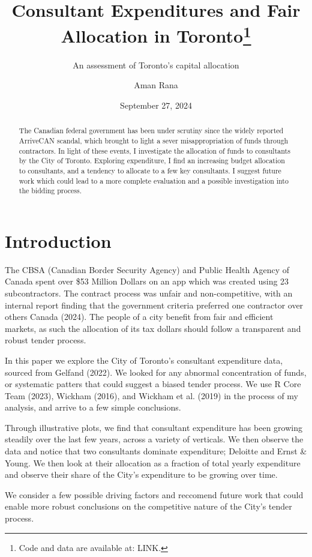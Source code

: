 \documentclass[
  letterpaper,
  DIV=11,
  numbers=noendperiod]{scrartcl}
\title{Consultant Expenditures and Fair Allocation in
Toronto\thanks{Code and data are available at: LINK.}}
\subtitle{An assessment of Toronto's capital allocation}
\author{Aman Rana}
\date{September 27, 2024}
\begin{document}
\maketitle
\begin{abstract}
The Canadian federal government has been under scrutiny since the widely
reported ArriveCAN scandal, which brought to light a sever
misappropriation of funds through contractors. In light of these events,
I investigate the allocation of funds to consultants by the City of
Toronto. Exploring expenditure, I find an increasing budget allocation
to consultants, and a tendency to allocate to a few key consultants. I
suggest future work which could lead to a more complete evaluation and a
possible investigation into the bidding process.
\end{abstract}


\section{Introduction}\label{introduction}

The CBSA (Canadian Border Security Agency) and Public Health Agency of
Canada spent over \$53 Million Dollars on an app which was created using
23 subcontractors. The contract process was unfair and non-competitive,
with an internal report finding that the government criteria preferred
one contractor over others Canada (2024). The people of a city benefit
from fair and efficient markets, as such the allocation of its tax
dollars should follow a transparent and robust tender process.

In this paper we explore the City of Toronto's consultant expenditure
data, sourced from Gelfand (2022). We looked for any abnormal
concentration of funds, or systematic patters that could suggest a
biased tender process. We use R Core Team (2023), Wickham (2016), and
Wickham et al. (2019) in the process of my analysis, and arrive to a few
simple conclusions.

Through illustrative plots, we find that consultant expenditure has been
growing steadily over the last few years, across a variety of verticals.
We then observe the data and notice that two consultants dominate
expenditure; Deloitte and Ernst \& Young. We then look at their
allocation as a fraction of total yearly expenditure and observe their
share of the City's expenditure to be growing over time.

We consider a few possible driving factors and reccomend future work
that could enable more robust conclusions on the competitive nature of
the City's tender process.
\end{document}

